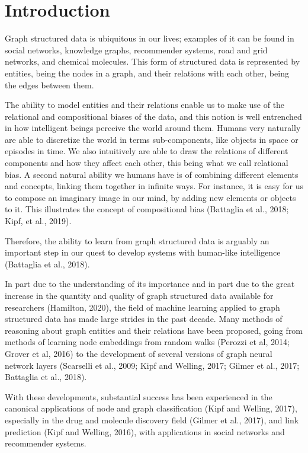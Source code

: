 \section{Introduction}
\label{sec:introduction}

Graph structured data is ubiquitous in our lives; examples of it can be found in social networks, knowledge graphs, recommender systems, road and grid networks, and chemical molecules. This form of structured data is represented by entities, being the nodes in a graph, and their relations with each other, being the edges between them. 

The ability to model entities and their relations enable us to make use of the relational and compositional biases of the data, and this notion is well entrenched in how intelligent beings perceive the world around them. Humans very naturally are able to discretize the world in terms sub-components, like objects in space or episodes in time. We also intuitively are able to draw the relations of different components and how they affect each other, this being what we call relational bias. A second natural ability we humans have is of combining different elements and concepts, linking them together in infinite ways. For instance, it is easy for us to compose an imaginary image in our mind, by adding new elements or objects to it. This illustrates the concept of compositional bias \textcite{B} (Battaglia et al., 2018; Kipf, et al., 2019).

Therefore, the ability to learn from graph structured data is arguably an important step in our quest to develop systems with human-like intelligence (Battaglia et al., 2018).

In part due to the understanding of its importance and in part due to the great increase in the quantity and quality of graph structured data available for researchers (Hamilton, 2020), the field of machine learning applied to graph structured data has made large strides in the past decade. Many methods of reasoning about graph entities and their relations have been proposed, going from methods of learning node embeddings from random walks (Perozzi et al, 2014; Grover et al, 2016) to the development of several versions of graph neural network layers (Scarselli et al., 2009; Kipf and Welling, 2017; Gilmer et al., 2017; Battaglia et al., 2018). 

With these developments, substantial success has been experienced in the canonical applications of node and graph classification (Kipf and Welling, 2017), especially in the drug and molecule discovery field (Gilmer et al., 2017), and link prediction (Kipf and Welling, 2016), with applications in social networks and recommender systems. 

